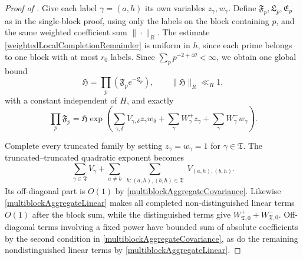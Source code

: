 \documentclass[oneside, 12pt]{amsart}
\theoremstyle{definition}
\begin{document}
	\begin{proof}[Proof of
		]
		{Give each label $\gamma=(a,h)$ its own variables
			$z_\gamma,w_\gamma$.  Define $\mathfrak F_p,\mathfrak L_p,\mathfrak E_p$
			as in the single-block proof, using only the labels on the block containing
			$p$, and the same weighted coefficient sum $\|\cdot\|_R$.
			The estimate \eqref{weightedLocalCompletionRemainder} is uniform in
			$h$, since each prime belongs to one block with at most $r_0$ labels.
			Since $\sum_p p^{-2+4\theta}<\infty$, we obtain one global bound
			\[
			\mathfrak H=\prod_p(\mathfrak F_pe^{-\mathfrak L_p}),
			\qquad \|\mathfrak H\|_R\ll_R1,
			\]
			with a constant independent of $H$, and exactly
			\begin{equation}\label{multiblockExactEulerCompletion}
				\prod_p\mathfrak F_p
				=\mathfrak H\exp\left(
				\sum_{\gamma,\delta}V_{\gamma,\delta}z_\gamma w_\delta
				+\sum_\gamma W_\gamma^+z_\gamma
				+\sum_\gamma W_\gamma^-w_\gamma\right).
			\end{equation}
			
			Complete every truncated family by setting
			$z_\gamma=w_\gamma=1$ for $\gamma\in\mathfrak T$.  The
			truncated--truncated quadratic exponent becomes
			\[
			\sum_{\gamma\in\mathfrak T}V_\gamma
			+\sum_{a\ne b}\sum_{\substack{h:(a,h),(b,h)\in\mathfrak T}}
			V_{(a,h),(b,h)}.
			\]
			Its off-diagonal part is $O(1)$ by
			\eqref{multiblockAggregateCovariance}.  Likewise
			\eqref{multiblockAggregateLinear} makes all completed
			non-distinguished linear terms $O(1)$ after the block sum, while the
			distinguished terms give
			$W_{\mathfrak T,0}^++W_{\mathfrak T,0}^-$.  Off-diagonal terms involving a fixed power have bounded sum of
			absolute coefficients by the second condition in
			\eqref{multiblockAggregateCovariance}, as do the remaining
			nondistinguished linear terms by \eqref{multiblockAggregateLinear}.
			
}
\end{proof}
\end{document}
